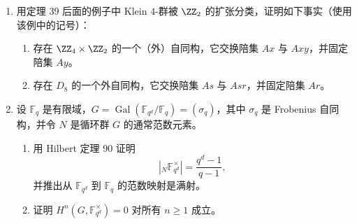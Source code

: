 \begin{enumerate}
  \item 用定理 39 后面的例子中 Klein $4$-群被 $\ZZ_2$ 的扩张分类，证明如下事实（使用该例中的记号）：
  \begin{enumerate}[label=(\alph*)]
    \item 存在 $\ZZ_4\times\ZZ_2$ 的一个（外）自同构，它交换陪集 $Ax$ 与 $Axy$，并固定陪集 $Ay$。
    \item 存在 $D_8$ 的一个外自同构，它交换陪集 $As$ 与 $Asr$，并固定陪集 $Ar$。
  \end{enumerate}

  \item 设 $\mathbb F_q$ 是有限域，$G=\operatorname{Gal}(\mathbb F_{q^d}/\mathbb F_q)=(\sigma_q)$，其中 $\sigma_q$ 是 Frobenius 自同构，并令 $N$ 是循环群 $G$ 的通常范数元素。
  \begin{enumerate}[label=(\alph*)]
    \item 用 Hilbert 定理 90 证明
    \[
      |{}_N\mathbb F_{q^d}^{\times}|=\frac{q^d-1}{q-1},
    \]
    并推出从 $\mathbb F_{q^d}$ 到 $\mathbb F_q$ 的范数映射是满射。
    \item 证明 $H^n(G,\mathbb F_{q^d}^{\times})=0$ 对所有 $n\geq1$ 成立。
  \end{enumerate}
\end{enumerate}
